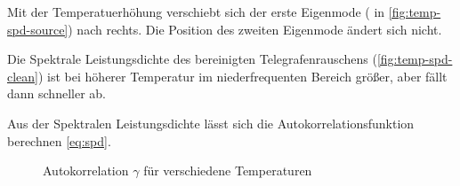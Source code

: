 \documentclass[main.tex]{subfiles}
\begin{document}
Mit der Temperatuerhöhung verschiebt sich der  erste Eigenmode ( in \cref{fig:temp-spd-source}) nach rechts. 
Die Position des zweiten Eigenmode ändert sich nicht.


Die Spektrale Leistungsdichte des bereinigten Telegrafenrauschens (\cref{fig:temp-spd-clean}) ist bei höherer Temperatur im niederfrequenten Bereich größer, aber fällt dann schneller ab.

Aus der Spektralen Leistungsdichte lässt sich die Autokorrelationsfunktion berechnen \cref*{eq:spd}.

\begin{figure}[H]
    \centering
    \caption{Autokorrelation $\gamma$ für verschiedene Temperaturen}\label{fig:temp-autocorr}
\end{figure}
\end{document}
